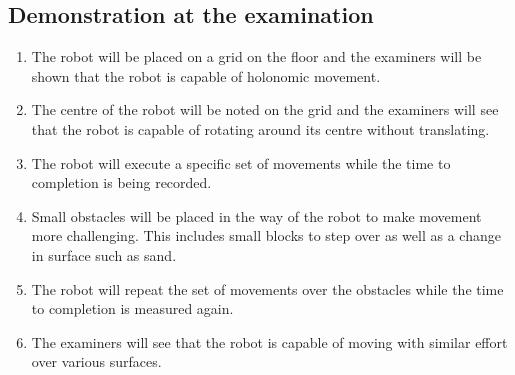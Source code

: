 \subsection*{Demonstration at the examination}
\begin{enumerate}
\item The robot will be placed on a grid on the floor and the examiners will be shown that the robot is capable of holonomic movement.
\item The centre of the robot will be noted on the grid and the examiners will see that the robot is capable of rotating around its centre without translating.
\item The robot will execute a specific set of movements while the time to completion is being recorded.
\item Small obstacles will be placed in the way of the robot to make movement more challenging. This includes small blocks to step over as well as a change in surface such as sand.
\item The robot will repeat the set of movements over the obstacles while the time to completion is measured again.
\item The examiners will see that the robot is capable of moving with similar effort over various surfaces.
\end{enumerate}

\newpage



